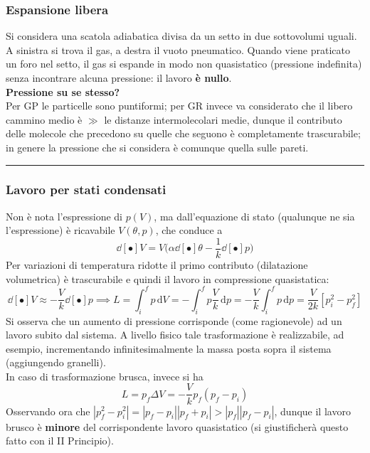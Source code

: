 \documentclass[10pt, oneside]{book}
\newcommand{\infobox}[2]{\vspace{0.5cm}~\\ \textbf{#1} \hrulefill \vspace{0.2cm}\\#2 {}\,\\\hrule \vspace{0.5cm}}
\newcommand{\ds}{\displaystyle}
\newcommand{\integral}[4]{\int_{#1}^{#2} #3 \, \mathrm{d}#4}
\begin{document}
\subsubsection*{Espansione libera}
Si considera una scatola adiabatica divisa da un setto in due sottovolumi uguali. A sinistra si trova il gas, a destra il vuoto pneumatico. Quando viene praticato un foro nel setto, il gas si espande in modo non quasistatico (pressione indefinita) senza incontrare alcuna pressione: il lavoro \textbf{è nullo}.
\infobox{Pressione su se stesso?}{Per GP le particelle sono puntiformi; per GR invece va considerato che il libero cammino medio è $\gg$ le distanze intermolecolari medie, dunque il contributo delle molecole che precedono su quelle che seguono è completamente trascurabile; in genere la pressione che si considera è comunque quella sulle pareti.}

\subsubsection*{Lavoro per stati condensati}
Non è nota l'espressione di $p(V)$, ma dall'equazione di stato (qualunque ne sia l'espressione) è ricavabile $V(\theta, p)$, che conduce a 
\[\dd[•]{V} = V \bigg(\alpha \dd[•]{\theta} - \frac{1}{k} \dd[•]{p}\bigg)\]
Per variazioni di temperatura ridotte il primo contributo (dilatazione volumetrica) è trascurabile e quindi il lavoro in compressione quasistatica:
\[\dd[•]{V} \approx - \frac{V}{k} \dd[•]{p} \implies L = \integral{i}{f}{p}{V} = - \integral{i}{f}{p \frac{V}{k}}{p} = - \frac{V}{k} \integral{i}{f}{p}{p} = \frac{V}{2k} [p_i^2 - p_f^2]\]
Si osserva che un aumento di pressione corrisponde (come ragionevole) ad un lavoro subito dal sistema. A livello fisico tale trasformazione è realizzabile, ad esempio, incrementando infinitesimalmente la massa posta sopra il sistema (aggiungendo granelli).\\
In caso di trasformazione brusca, invece si ha
\[L = p_f \Delta V = -\frac{V}{k} p_f (p_f - p_i)\]
Osservando ora che $\ds |p_f^2 - p_i^2| = |p_f - p_i| |p_f + p_i| > |p_f| |p_f - p_i|$, dunque il lavoro brusco è \textbf{minore} del corrispondente lavoro quasistatico (si giustificherà questo fatto con il II Principio).
\end{document}
